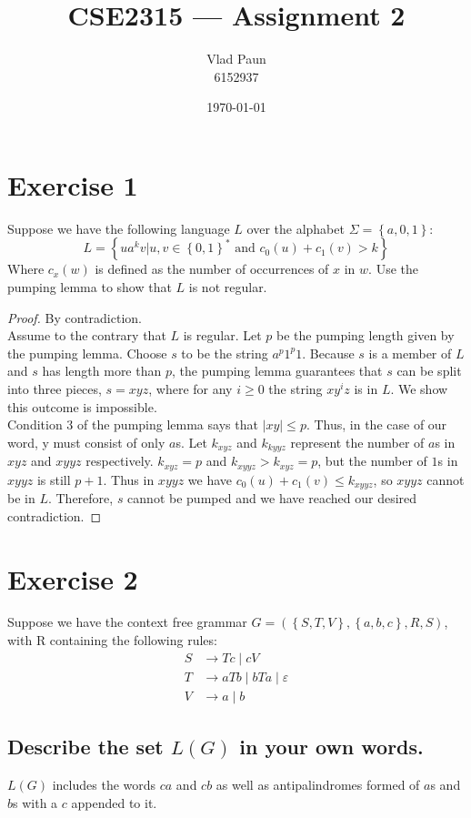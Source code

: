 \documentclass[a4paper,11pt]{article}
\title{\textbf{CSE2315 — Assignment 2}}
\author{Vlad Paun \\ 6152937}
\date{\today}
\newcommand{\Alphabet}{\Sigma}
\newcommand{\eps}{\varepsilon}
\newcommand{\set}[1]{\left\{ #1 \right\}}
\begin{document}
	\maketitle

	\section{Exercise 1}
	Suppose we have the following language $L$ over the alphabet $\Alphabet=\set{a,0,1}$:
	\[
	L = \set{ua^kv | u,v\in \set{0,1}^* \text{ and }c_0(u) + c_1(v) > k}
	\]
	Where $c_x(w)$ is defined as the number of occurrences of $x$ in $w$. Use the pumping lemma to show that $L$ is not regular.

	\begin{proof}By contradiction.\\
		Assume to the contrary that $L$ is regular. Let $p$ be the pumping length given by the pumping lemma. Choose $s$ to be the string $a^p1^p1$. Because $s$ is a member of $L$ and $s$ has length more than $p$, the pumping lemma guarantees that $s$ can be split into three pieces, $s = xyz$, where for any $i \ge 0$ the string $xy^iz$ is in $L$. We show this outcome is impossible.\\
		Condition 3 of the pumping lemma says that $|xy| \le p$. Thus, in the case of our word, y must consist of only $a$s. Let $k_{xyz}$ and $k_{kyyz}$ represent the number of $a$s in $xyz$ and $xyyz$ respectively. $k_{xyz} = p$ and $k_{xyyz} > k_{xyz} = p$, but the number of $1$s in $xyyz$ is still $p+1$. Thus in $xyyz$ we have $c_0(u) + c_1(v) \le k_{xyyz}$, so $xyyz$ cannot be in $L$. Therefore, $s$ cannot be pumped and we have reached our desired contradiction.
	\end{proof}

	\section{Exercise 2}
	Suppose we have the context free grammar $G=(\set{S,T,V},\set{a,b,c},R,S)$, with R containing the following rules:
	\begin{align*}
		S &\to Tc\mid cV\\
		T &\to aTb\mid bTa\mid \eps\\
		V &\to a\mid b
	\end{align*}

	\subsection{Describe the set $L(G)$ in your own words.}
	$L(G)$ includes the words $ca$ and $cb$ as well as antipalindromes formed of $a$s and $b$s with a $c$ appended to it.
\end{document}
